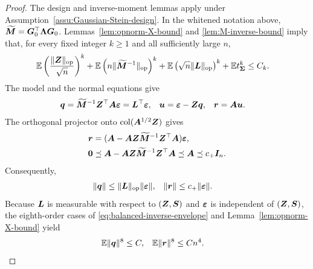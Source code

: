 \documentclass{article}
\theoremstyle{plain} %
\theoremstyle{definition} %
\theoremstyle{definition} %
\begin{document}
\begin{proof}
The design and inverse-moment lemmas apply under
Assumption~\ref{assu:Gaussian-Stein-design}.  In the whitened notation above,
$\widetilde{\boldsymbol{M}}=\boldsymbol{G}_0^\top\boldsymbol{\Lambda}\boldsymbol{G}_0$.
Lemmas~\ref{lem:opnorm-X-bound} and \ref{lem:M-inverse-bound} imply that,
for every fixed integer $k\geq1$ and all sufficiently large $n$,
\begin{align}
    {\mathbb{E}}\left(\frac{\lVert\boldsymbol{Z}\rVert_{\rm op}}{\sqrt n}\right)^k
    +{\mathbb{E}}\left(n\lVert\widetilde{\boldsymbol{M}}^{-1}\rVert_{\rm op}\right)^k
    +{\mathbb{E}}\left(\sqrt n\lVert\boldsymbol{L}\rVert_{\rm op}\right)^k
    +{\mathbb{E}} t_{\boldsymbol{\Sigma}}^k
    &\leq C_k.
    \label{eq:balanced-inverse-envelope}
\end{align}
The model and the normal equations give
\begin{align}
    \boldsymbol{q}&=\widetilde{\boldsymbol{M}}^{-1}\boldsymbol{Z}^\top\boldsymbol{A}{\boldsymbol{\varepsilon} }
        =\boldsymbol{L}^\top{\boldsymbol{\varepsilon} },
    & \boldsymbol{u}&={\boldsymbol{\varepsilon} }-\boldsymbol{Z}\boldsymbol{q},
    & \boldsymbol{r}&=\boldsymbol{A}\boldsymbol{u}.
    \label{eq:balanced-qur}
\end{align}
The orthogonal projector onto $\operatorname{col}(\boldsymbol{A}^{1/2}\boldsymbol{Z})$ gives
\begin{align}
    \boldsymbol{r}&=(\boldsymbol{A}-\boldsymbol{A}\boldsymbol{Z}\widetilde{\boldsymbol{M}}^{-1}\boldsymbol{Z}^\top\boldsymbol{A}){\boldsymbol{\varepsilon} },
    \notag\\
    \mathbf{0}&\preceq\boldsymbol{A}-\boldsymbol{A}\boldsymbol{Z}\widetilde{\boldsymbol{M}}^{-1}\boldsymbol{Z}^\top\boldsymbol{A}
       \preceq\boldsymbol{A}\preceq c_+\boldsymbol{I}_n.
    \label{eq:balanced-residual-contraction}
\end{align}
Consequently,
\begin{align*}
    \lVert\boldsymbol{q}\rVert&\leq\lVert\boldsymbol{L}\rVert_{\rm op}\lVert{\boldsymbol{\varepsilon} }\rVert,
    & \lVert\boldsymbol{r}\rVert&\leq c_+\lVert{\boldsymbol{\varepsilon} }\rVert.
\end{align*}
Because $\boldsymbol{L}$ is measurable with respect to $(\boldsymbol{Z},\boldsymbol{S})$ and ${\boldsymbol{\varepsilon} }$ is
independent of $(\boldsymbol{Z},\boldsymbol{S})$, the eighth-order cases of
\eqref{eq:balanced-inverse-envelope} and
Lemma~\ref{lem:opnorm-X-bound} yield
\begin{align}
    {\mathbb{E}}\lVert\boldsymbol{q}\rVert^{8}&\leq C,
    & {\mathbb{E}}\lVert\boldsymbol{r}\rVert^{8}&\leq Cn^4.
    \label{eq:balanced-response-sufficient-conditions}
\end{align}


\end{proof}
\end{document}

